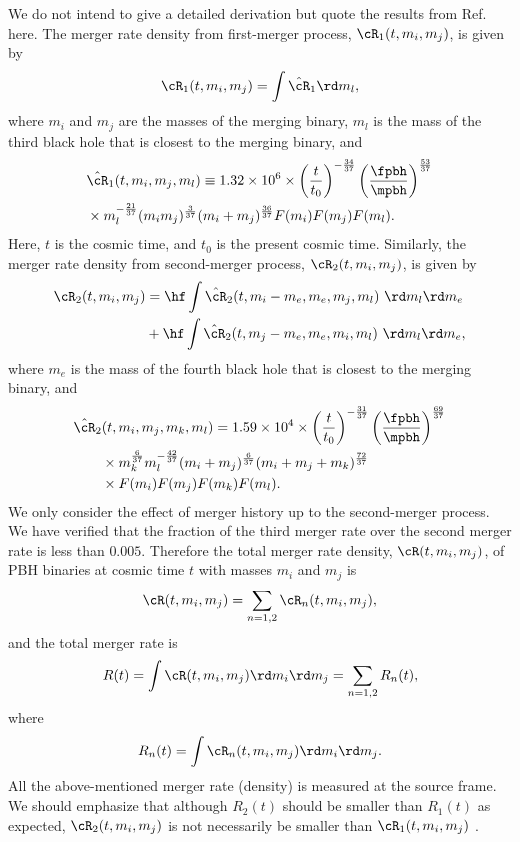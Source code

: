 \documentclass[
reprint,           %
superscriptaddress,%
amsmath,           %
amssymb,           %
aps,               %
prd,               %
notitlepage,       %
longbibliography,  %
floatfix,          %
nofootinbib,
]{revtex4-1}
\def\({\left(}
\def\){\right)}
\def\e{\begin{equation}}
\def\q{\end{equation}}
\begin{document}
We do not intend to give a detailed derivation but quote the results from Ref.~\cite{Liu:2019rnx} here.
The merger rate density from first-merger process, $\cR_1(t, m_i, m_j)$, is given by \cite{Liu:2019rnx}
\e 
\cR_1(t, m_i, m_j) = \int \hat{\cR}_1 \rd m_l,
\q 
where $m_i$ and $m_j$ are the masses of the merging binary, $m_l$ is the mass of the third black hole that is closest to the merging binary, and
\e 
\begin{split}
	&\hat{\cR}_1(t, m_i, m_j, m_l)
	\equiv 1.32 \times 10^6 \times \(\frac{t}{t_0}\)^{-\frac{34}{37}}\(\frac{\fpbh}{\mpbh}\)^\frac{53}{37} \\ 
	&\times m_l^{-\frac{21}{37}} (m_i m_j)^\frac{3}{37} (m_i + m_j)^\frac{36}{37} F(m_i) F(m_j) F(m_l).     
\end{split}
\q
Here, $t$ is the cosmic time, and $t_0$ is the present cosmic time.
Similarly, the merger rate density from second-merger process, $\cR_2(t, m_i, m_j)$, is given by \cite{Liu:2019rnx}
\e 
\begin{split}
	\cR_2(t, m_i, m_j) &= \hf \int \hat{\cR}_2(t, m_i-m_e, m_e, m_j, m_l)\ \rd m_l \rd m_e\\
	&+ \hf \int \hat{\cR}_2(t, m_j-m_e, m_e, m_i, m_l)\ \rd m_l \rd m_e,
\end{split}
\q 
where $m_e$ is the mass of the fourth black hole that is closest to the merging binary, and
\e 
\begin{split}
	&\hat{\cR}_2(t, m_i, m_j,m_k, m_l)
	=1.59 \times 10^4 \times \(\frac{t}{t_0}\)^{-\frac{31}{37}} \(\frac{\fpbh}{\mpbh}\)^\frac{69}{37}\\ 
	&\qquad\times m_k^{\frac{6}{37}} m_l^{-\frac{42}{37}} (m_i+ m_j)^\frac{6}{37} (m_i + m_j + m_k)^\frac{72}{37}\\
	&\qquad\times F(m_i) F(m_j) F(m_k) F(m_l).     
\end{split}
\q
We only consider the effect of merger history up to the second-merger process. We have verified that the fraction of the third merger rate over the second merger rate is less than $0.005$.
Therefore the total merger rate density, $\cR(t, m_i, m_j)$, of PBH binaries at cosmic time $t$ with masses $m_i$ and $m_j$ is
\e\label{cR}
\cR(t, m_i, m_j) =  \sum_{n=1,2} \cR_n(t, m_i, m_j),
\q 
and the total merger rate is
\e\label{Rt}
R(t) = \int \cR(t, m_i, m_j) \rd m_i \rd m_j = \sum_{n=1,2} R_n(t),
\q 
where
\e 
R_n(t) = \int \cR_n(t, m_i, m_j) \rd m_i \rd m_j.
\q 
All the above-mentioned merger rate (density) is measured at the source frame.
We should emphasize that although $R_2(t)$ should be smaller than $R_1(t)$ as expected, $\cR_2(t, m_i, m_j)$ is not necessarily be smaller than $\cR_1(t, m_i, m_j)$ \cite{Liu:2019rnx}. 
\end{document}
